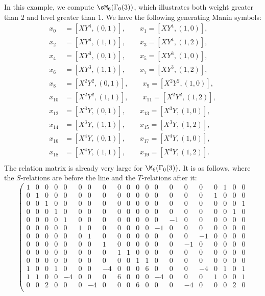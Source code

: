 \begin{example}
In this example, we compute $\sM_6(\Gamma_0(3))$, 
which illustrates both weight greater than $2$
and level greater than $1$.
We have the following generating Manin symbols:
\begin{align*}
x_{0} &= [XY^4,(0,1)],\qquad x_{1} = [XY^4,(1,0)],\\
x_{2} &= [XY^4,(1,1)], \qquad x_{3} = [XY^4,(1,2)],\\
x_{4} &= [XY^3,(0,1)], \qquad x_{5} = [XY^3,(1,0)],\\
x_{6} &= [XY^3,(1,1)], \qquad 
x_{7} = [XY^3,(1,2)],\\
x_{8} &= [X^2Y^2,(0,1)], \qquad 
\!\!x_{9} = [X^2Y^2,(1,0)],\\
x_{10} &= [X^2Y^2,(1,1)], \qquad 
\!\!\!\!x_{11} = [X^2Y^2,(1,2)],\\
x_{12} &= [X^3Y,(0,1)], \qquad 
x_{13} = [X^3Y,(1,0)],\\
x_{14} &= [X^3Y,(1,1)], \qquad 
x_{15} = [X^3Y,(1,2)],\\
x_{16} &= [X^4Y,(0,1)], \qquad 
x_{17} = [X^4Y,(1,0)],\\
x_{18} &= [X^4Y,(1,1)], \qquad 
x_{19} = [X^4Y,(1,2)].\\
\end{align*}
The relation matrix is already very large
for $\M_6(\Gamma_0(3))$.  It is as follows, where the $S$-relations
are before the line and the $T$-relations after it:
{\mbox{}\tiny
$$
\left(\begin{array}{cccccccccccccccccccc}
1&0&0&0&0&0&0&0&0&0&0&0&0&0&0&0&0&1&0&0\\
0&1&0&0&0&0&0&0&0&0&0&0&0&0&0&0&1&0&0&0\\
0&0&1&0&0&0&0&0&0&0&0&0&0&0&0&0&0&0&0&1\\
0&0&0&1&0&0&0&0&0&0&0&0&0&0&0&0&0&0&1&0\\
0&0&0&0&1&0&0&0&0&0&0&0&0&-1&0&0&0&0&0&0\\
0&0&0&0&0&1&0&0&0&0&0&0&-1&0&0&0&0&0&0&0\\
0&0&0&0&0&0&1&0&0&0&0&0&0&0&0&-1&0&0&0&0\\
0&0&0&0&0&0&0&1&0&0&0&0&0&0&-1&0&0&0&0&0\\
0&0&0&0&0&0&0&0&1&1&0&0&0&0&0&0&0&0&0&0\\
0&0&0&0&0&0&0&0&0&0&1&1&0&0&0&0&0&0&0&0\\\hline
1&0&0&1&0&0&0&-4&0&0&0&6&0&0&0&-4&0&1&0&1\\
1&1&0&0&-4&0&0&0&6&0&0&0&-4&0&0&0&1&0&0&1\\
0&0&2&0&0&0&-4&0&0&0&6&0&0&0&-4&0&0&0&2&0\\

\end{array}$$}
\end{example}
